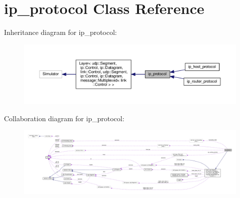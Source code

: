 \hypertarget{classip__protocol}{}\section{ip\+\_\+protocol Class Reference}
\label{classip__protocol}


Inheritance diagram for ip\+\_\+protocol\+:\nopagebreak
\begin{figure}[H]
\begin{center}
\leavevmode
\includegraphics[width=350pt]{classip__protocol__inherit__graph}
\end{center}
\end{figure}


Collaboration diagram for ip\+\_\+protocol\+:
\nopagebreak
\begin{figure}[H]
\begin{center}
\leavevmode
\includegraphics[width=350pt]{classip__protocol__coll__graph}
\end{center}
\end{figure}
